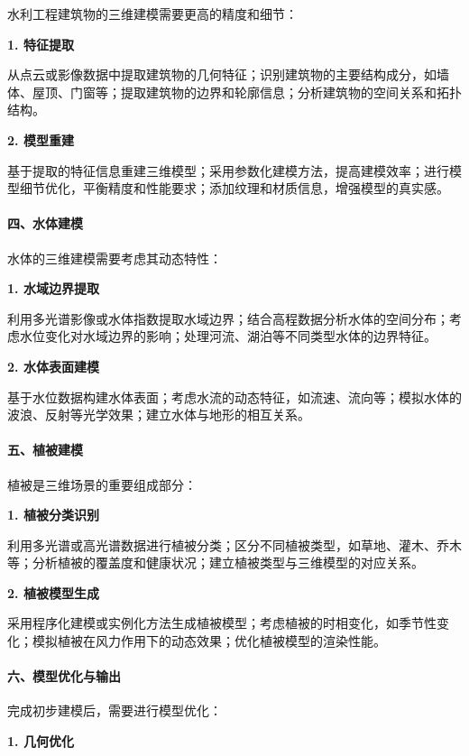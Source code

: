 水利工程建筑物的三维建模需要更高的精度和细节：

\textbf{1. 特征提取}

从点云或影像数据中提取建筑物的几何特征；识别建筑物的主要结构成分，如墙体、屋顶、门窗等；提取建筑物的边界和轮廓信息；分析建筑物的空间关系和拓扑结构。

\textbf{2. 模型重建}

基于提取的特征信息重建三维模型；采用参数化建模方法，提高建模效率；进行模型细节优化，平衡精度和性能要求；添加纹理和材质信息，增强模型的真实感。

\paragraph{四、水体建模}\label{ux56dbux6c34ux4f53ux5efaux6a21}

水体的三维建模需要考虑其动态特性：

\textbf{1. 水域边界提取}

利用多光谱影像或水体指数提取水域边界；结合高程数据分析水体的空间分布；考虑水位变化对水域边界的影响；处理河流、湖泊等不同类型水体的边界特征。

\textbf{2. 水体表面建模}

基于水位数据构建水体表面；考虑水流的动态特征，如流速、流向等；模拟水体的波浪、反射等光学效果；建立水体与地形的相互关系。

\paragraph{五、植被建模}\label{ux4e94ux690dux88abux5efaux6a21}

植被是三维场景的重要组成部分：

\textbf{1. 植被分类识别}

利用多光谱或高光谱数据进行植被分类；区分不同植被类型，如草地、灌木、乔木等；分析植被的覆盖度和健康状况；建立植被类型与三维模型的对应关系。

\textbf{2. 植被模型生成}

采用程序化建模或实例化方法生成植被模型；考虑植被的时相变化，如季节性变化；模拟植被在风力作用下的动态效果；优化植被模型的渲染性能。

\paragraph{六、模型优化与输出}\label{ux516dux6a21ux578bux4f18ux5316ux4e0eux8f93ux51fa}

完成初步建模后，需要进行模型优化：

\textbf{1. 几何优化}

